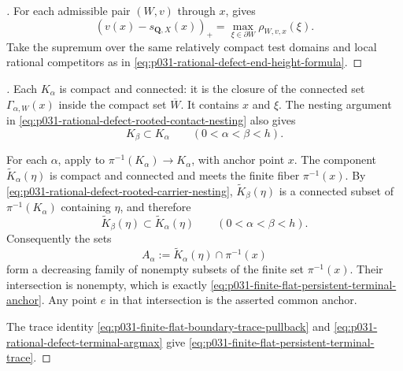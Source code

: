 \begin{proof}[]
For each admissible pair $(W,v)$ through $x$,
 gives
\[
       (v(x)-s_{\mathbf Q,X}(x))_+
          =\max_{\xi\in\partial W}\rho_{W,v,x}(\xi).
\]
Take the supremum over the same relatively compact test domains and local
rational competitors as in
\eqref{eq:p031-rational-defect-end-height-formula}.
\end{proof}

\begin{proof}[]
Each $K_\alpha$ is compact and connected: it is the closure of the connected
set $\Gamma_{\alpha,W}(x)$ inside the compact set $\overline W$.  It contains
$x$ and $\xi$.  The nesting argument in
\eqref{eq:p031-rational-defect-rooted-contact-nesting} also gives
\begin{equation}
\label{eq:p031-rational-defect-rooted-carrier-nesting}
                    K_\beta\subset K_\alpha
                    \qquad(0<\alpha<\beta<h).
\end{equation}

For each $\alpha$, apply
 to
$\pi^{-1}(K_\alpha)\to K_\alpha$, with anchor point $x$.  The component
$\widetilde K_\alpha(\eta)$ is compact and connected and meets the finite
fiber $\pi^{-1}(x)$.  By
\eqref{eq:p031-rational-defect-rooted-carrier-nesting},
$\widetilde K_\beta(\eta)$ is a connected subset of
$\pi^{-1}(K_\alpha)$ containing $\eta$, and therefore
\[
             \widetilde K_\beta(\eta)
                  \subset\widetilde K_\alpha(\eta)
             \qquad(0<\alpha<\beta<h).
\]
Consequently the sets
\[
 A_\alpha:=\widetilde K_\alpha(\eta)\cap\pi^{-1}(x)
\]
form a decreasing family of nonempty subsets of the finite set
$\pi^{-1}(x)$.  Their intersection is nonempty, which is exactly
\eqref{eq:p031-finite-flat-persistent-terminal-anchor}.  Any point $e$ in
that intersection is the asserted common anchor.

The trace identity
\eqref{eq:p031-finite-flat-boundary-trace-pullback} and
\eqref{eq:p031-rational-defect-terminal-argmax} give
\eqref{eq:p031-finite-flat-persistent-terminal-trace}.
\end{proof}
